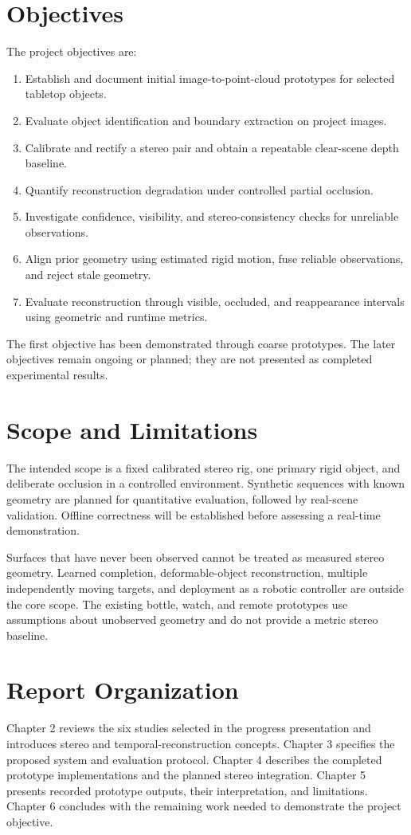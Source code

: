 \section{Objectives}
The project objectives are:
\begin{enumerate}
\item Establish and document initial image-to-point-cloud prototypes for selected tabletop objects.
\item Evaluate object identification and boundary extraction on project images.
\item Calibrate and rectify a stereo pair and obtain a repeatable clear-scene depth baseline.
\item Quantify reconstruction degradation under controlled partial occlusion.
\item Investigate confidence, visibility, and stereo-consistency checks for unreliable observations.
\item Align prior geometry using estimated rigid motion, fuse reliable observations, and reject stale geometry.
\item Evaluate reconstruction through visible, occluded, and reappearance intervals using geometric and runtime metrics.
\end{enumerate}
The first objective has been demonstrated through coarse prototypes. The later objectives remain ongoing or planned; they are not presented as completed experimental results.

\section{Scope and Limitations}
The intended scope is a fixed calibrated stereo rig, one primary rigid object, and deliberate occlusion in a controlled environment. Synthetic sequences with known geometry are planned for quantitative evaluation, followed by real-scene validation. Offline correctness will be established before assessing a real-time demonstration.

Surfaces that have never been observed cannot be treated as measured stereo geometry. Learned completion, deformable-object reconstruction, multiple independently moving targets, and deployment as a robotic controller are outside the core scope. The existing bottle, watch, and remote prototypes use assumptions about unobserved geometry and do not provide a metric stereo baseline.

\section{Report Organization}
Chapter 2 reviews the six studies selected in the progress presentation and introduces stereo and temporal-reconstruction concepts. Chapter 3 specifies the proposed system and evaluation protocol. Chapter 4 describes the completed prototype implementations and the planned stereo integration. Chapter 5 presents recorded prototype outputs, their interpretation, and limitations. Chapter 6 concludes with the remaining work needed to demonstrate the project objective.
